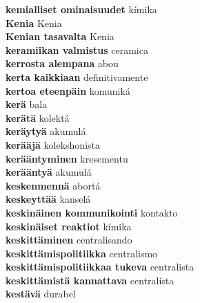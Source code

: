 \textbf{ kemialliset ominaisuudet  } kímika \\
\textbf{ Kenia  } Kenia \\
\textbf{ Kenian tasavalta  } Kenia \\
\textbf{ keramiikan valmistus  } ceramica \\
\textbf{ kerrosta alempana  } abou \\
\textbf{ kerta kaikkiaan  } definitivamente \\
\textbf{ kertoa eteenpäin  } komuniká \\
\textbf{ kerä  } bala \\
\textbf{ kerätä  } kolektá \\
\textbf{ keräytyä  } akumulá \\
\textbf{ kerääjä  } kolekshonista \\
\textbf{ kerääntyminen  } kresementu \\
\textbf{ kerääntyä  } akumulá \\
\textbf{ keskenmennä  } abortá \\
\textbf{ keskeyttää  } kanselá \\
\textbf{ keskinäinen kommunikointi  } kontakto \\
\textbf{ keskinäiset reaktiot  } kímika \\
\textbf{ keskittäminen  } centralisando \\
\textbf{ keskittämispolitiikka  } centralismo \\
\textbf{ keskittämispolitiikkaa tukeva  } centralista \\
\textbf{ keskittämistä kannattava  } centralista \\
\textbf{ kestävä  } durabel \\
